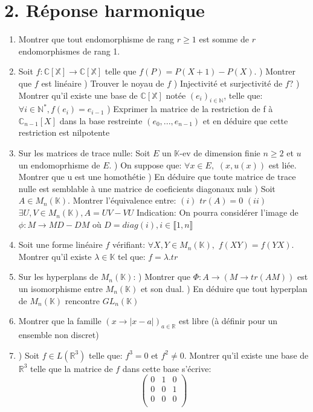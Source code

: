 \documentclass[11pt]{article}
\newenvironment{qparts}{\begin{enumerate}[{(}a{)}]}{\end{enumerate}}
\begin{document}
\section*{2. Réponse harmonique}
\begin{qparts}

\item Montrer que tout endomorphisme de rang $r\geq 1$ est somme de $r$ endomorphismes de rang 1.

\item Soit $f:\mathbb{C[X]}\rightarrow\mathbb{C[X]}$ telle que $f(P)=P(X+1)-P(X)$. 
) Montrer que $f$ est linéaire
) Trouver le noyau de $f$
) Injectivité et surjectivité de $f$?
) Montrer qu'il existe une base de $\mathbb{C[X]}$ notée $(e_i)_{i\in\mathbb{N}}$, telle que: $\forall i\in\mathbb{N^*}, f(e_i)=e_{i-1}$
) Exprimer la matrice de la restriction de f à $\mathbb{C}_{n-1}[X]$ dans la base restreinte $(e_0,...,e_{n-1})$ \subitem et en déduire que cette restriction est nilpotente

\item{Sur les matrices de trace nulle:}
\subitem Soit $E$ un $\mathbb{K}$-ev de dimension finie $n\geq 2$ et $u$ un endomoprhisme de $E$.
) On suppose que: $\forall x\in E,$ $(x,u(x))$ est liée. Montrer que u est une homothétie
) En déduire que toute matrice de trace nulle est semblable à une matrice de coeficients \subitem  diagonaux nuls
) Soit $A\in M_n(\mathbb{K})$. Montrer l'équivalence entre: \subitem $(i)$ $tr(A)=0$
\subitem $(ii)$ $\exists U,V \in M_n(\mathbb{K}), A=UV-VU$
\subitem Indication: On pourra considérer l'image de $\phi:M\rightarrow MD-DM$ où $D=diag(i),i\in\llbracket 1,n\rrbracket$

\item Soit une forme linéaire $f$ vérifiant: $\forall X,Y\in M_n(\mathbb{K}),$ $f(XY)=f(YX)$. Montrer qu'il existe $\lambda\in\mathbb{K}$ tel que: $f=\lambda.tr$

\item{Sur les hyperplans de $M_n(\mathbb{K})$:}
) Montrer que $\Phi:A\rightarrow (M\rightarrow tr(AM))$ est un isomorphisme entre $M_n(\mathbb{K})$ et son dual.
) En déduire que tout hyperplan de $M_n(\mathbb{K})$ rencontre $GL_n(\mathbb{K})$

\item Montrer que la famille $(x\rightarrow |x-a|)_{a\in\mathbb{R}}$ est libre (à définir pour un ensemble non discret)

\item {}) Soit $f\in L(\mathbb{R}^3)$ telle que: $f^3=0$ et $f^2\neq 0$. Montrer qu'il existe une base de $\mathbb{R}^3$ telle que la matrice de $f$ dans cette base s'écrive: 
$$\begin{pmatrix}
0&1&0\\
0&0&1\\
0&0&0\\
\end{pmatrix}$$


\end{qparts}
\end{document}
